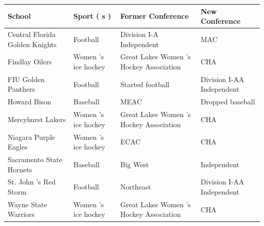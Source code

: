 \documentclass{article}
\begin{document}
\begin{tabular}{llll}
\toprule
School & Sport ( s ) & Former Conference & New Conference \\
\midrule
Central Florida Golden Knights & Football & Division I-A Independent & MAC \\
Findlay Oilers & Women 's ice hockey & Great Lakes Women 's Hockey Association & CHA \\
FIU Golden Panthers & Football & Started football & Division I-AA Independent \\
Howard Bison & Baseball & MEAC & Dropped baseball \\
Mercyhurst Lakers & Women 's ice hockey & Great Lakes Women 's Hockey Association & CHA \\
Niagara Purple Eagles & Women 's ice hockey & ECAC & CHA \\
Sacramento State Hornets & Baseball & Big West & Independent \\
St. John 's Red Storm & Football & Northeast & Division I-AA Independent \\
Wayne State Warriors & Women 's ice hockey & Great Lakes Women 's Hockey Association & CHA \\
\bottomrule
\end{tabular}
\end{document}
